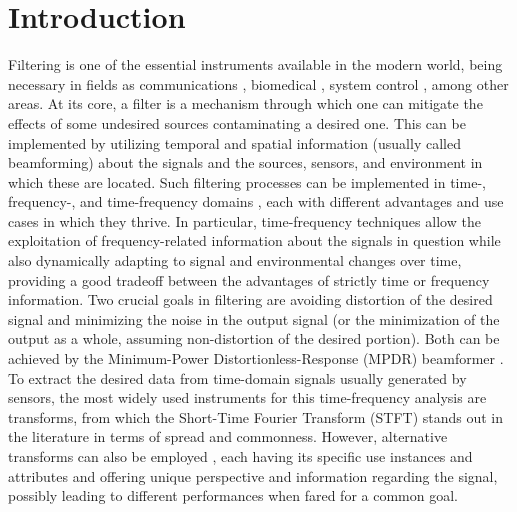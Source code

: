 \section{Introduction}
\label{sec:introduction}

Filtering is one of the essential instruments available in the modern world, being necessary in fields as communications \cite{chen_source_2002}, biomedical \cite{lobato_worst-case-optimization_2020,lu_biomedical_1994,nguyen_minimum_2017}, system control \cite{han_comparative_2016, hagglund_signal_2012}, among other areas. At its core, a filter is a mechanism through which one can mitigate the effects of some undesired sources contaminating a desired one. This can be implemented by utilizing temporal and spatial information (usually called beamforming) about the signals and the sources, sensors, and environment in which these are located. Such filtering processes can be implemented in time-, frequency-, and time-frequency domains \cite{benesty_fundamentals_2017}, each with different advantages and use cases in which they thrive. In particular, time-frequency techniques allow the exploitation of frequency-related information about the signals in question while also dynamically adapting to signal and environmental changes over time, providing a good tradeoff between the advantages of strictly time or frequency information. Two crucial goals in filtering are avoiding distortion of the desired signal and minimizing the noise in the output signal (or the minimization of the output as a whole, assuming non-distortion of the desired portion). Both can be achieved by the Minimum-Power Distortionless-Response (MPDR) beamformer \cite{capon_high-resolution_1969,erdogan_improved_2016}. To extract the desired data from time-domain signals usually generated by sensors, the most widely used instruments for this time-frequency analysis are transforms, from which the Short-Time Fourier Transform (STFT) \cite{kiymik_comparison_2005,pan_microphone_2021} stands out in the literature in terms of spread and commonness. However, alternative transforms can also be employed \cite{chen_wavelet-based_2018,yang_general_2014,almeida_fractional_1994}, each having its specific use instances and attributes and offering unique perspective and information regarding the signal, possibly leading to different performances when fared for a common goal.

